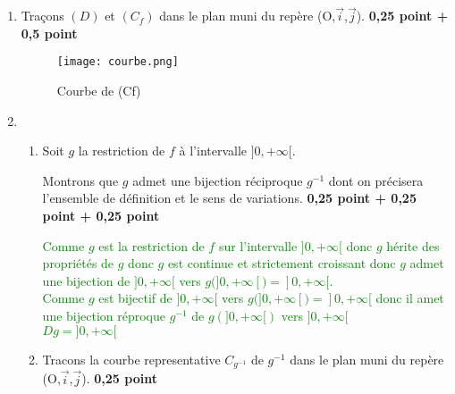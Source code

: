 \documentclass[12pt]{article}
\begin{document}
\begin{enumerate}
\begin{enumerate}
\end{enumerate}
\item Traçons $(D)$ et $(C_{f})$ dans le plan muni du repère (O,$\vec{i}$,$\vec{j}$). \textbf{ 0,25 point + 0,5 point}
\begin{figure}[h]
\centering
\texttt{[image: courbe.png]}
\caption{Courbe de (Cf)}
\label{fig:monimage}
\end{figure}
\item
\begin{enumerate}
\item[a.] Soit $g$ la restriction de $f$ à l'intervalle $]0, +\infty[.$

	 Montrons que $g$ admet une bijection réciproque $g^{-1}$ dont on précisera l'ensemble de définition et le
	 sens de variations. \textbf{ 0,25 point + 0,25 point + 0,25 point}

\textcolor{green}{Comme $g$ est la restriction de $f$ sur l'intervalle $]0, +\infty[$ donc $g$ hérite des propriétés de $g$ donc $g$ est continue et strictement croissant donc $g$ admet une bijection de $]0, +\infty[$ vers $g(]0, +\infty[)=]0, +\infty[$.\\
Comme $g$ est bijectif de $]0, +\infty[$ vers $g(]0, +\infty[)=]0, +\infty[$ donc il amet une bijection réproque $g^{-1}$ de $g(]0, +\infty[)$ vers  $]0, +\infty[$\\
$Dg=]0, +\infty[$}
\item[b.] Tracons la courbe representative $C_{g^{-1}}$ de $g^{-1}$ dans le plan muni du repère \\
			(O,$\vec{i}$,$\vec{j}$). \textbf{ 0,25 point}
			

\end{enumerate}
\end{enumerate}
\end{document}
